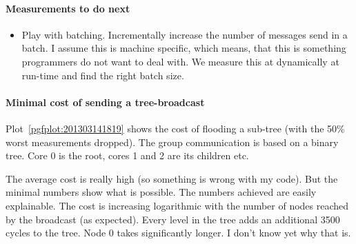 \documentclass{article}
\begin{document}
\paragraph{Measurements to do next} %
\begin{itemize}
\item Play with batching. Incrementally increase the number of
  messages send in a batch. I assume this is machine specific, which
  means, that this is something programmers do not want to deal
  with. We measure this at dynamically at run-time and find the right
  batch size.
\end{itemize}

\paragraph{Minimal cost of sending a tree-broadcast} %
Plot~\ref{pgfplot:201303141819} shows the cost of flooding a sub-tree
(with the 50\% worst measurements dropped). The group communication is
based on a binary tree. Core 0 is the root, cores 1 and 2 are its
children etc.

The average cost is really high (so something is wrong with my
code). But the minimal numbers show what is possible. The numbers
achieved are easily explainable. The cost is increasing
logarithmic with the number of nodes reached by the broadcast (as
expected). Every level in the tree adds an additional 3500 cycles to
the tree. Node 0 takes significantly longer. I don't know yet why that
is.
\end{document}
